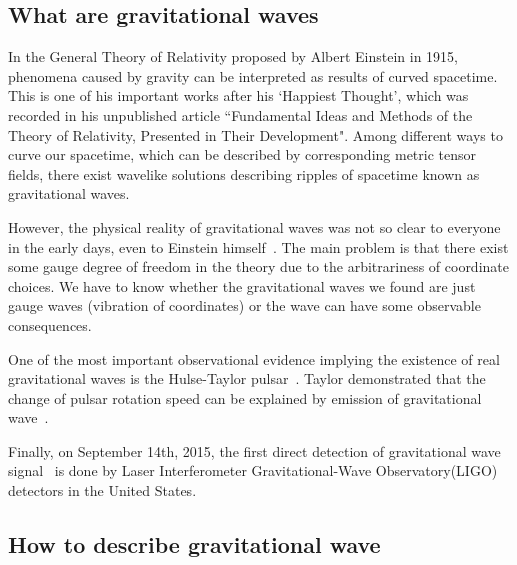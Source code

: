 \subsection{What are gravitational waves}

In the General Theory of Relativity proposed by Albert Einstein in 1915, phenomena caused by gravity can be interpreted as results of curved spacetime. This is one of his important works after his `Happiest Thought', which was recorded in his unpublished article ``Fundamental Ideas and Methods of the Theory of Relativity, Presented in Their Development"\cite{Einstein:happy}. Among different ways to curve our spacetime, which can be described by corresponding metric tensor fields, there exist wavelike solutions describing ripples of spacetime known as gravitational waves.

However, the physical reality of gravitational waves was not so clear to everyone in the early days, even to Einstein himself~\cite{Einstein:prl, Einstein:ongw}. The main problem is that there exist some gauge degree of freedom in the theory due to the arbitrariness of coordinate choices. We have to know whether the gravitational waves we found are just gauge waves (vibration of coordinates) or the wave can have some observable consequences. 

One of the most important observational evidence implying the existence of real gravitational waves is the Hulse-Taylor pulsar~\cite{HulseTaylor:discovery}. Taylor demonstrated that the change of pulsar rotation speed can be explained by emission of gravitational wave~\cite{HulseTaylor:gr, HulseTaylor:gr2}.  

Finally, on September 14th, 2015, the first direct detection of gravitational wave signal~\cite{gw:150914_det} is done by Laser Interferometer Gravitational-Wave Observatory(LIGO) detectors in the United States.

\subsection{How to describe gravitational wave}

